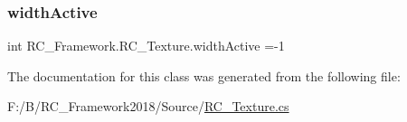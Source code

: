 \subsubsection{\texorpdfstring{width\+Active}{widthActive}}
{\footnotesize\ttfamily int R\+C\+\_\+\+Framework.\+R\+C\+\_\+\+Texture.\+width\+Active =-\/1}



The documentation for this class was generated from the following file\+:\begin{DoxyCompactItemize}
\item 
F\+:/\+B/\+R\+C\+\_\+\+Framework2018/\+Source/\mbox{\hyperlink{_r_c___texture_8cs}{R\+C\+\_\+\+Texture.\+cs}}\end{DoxyCompactItemize}
